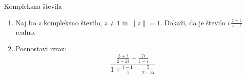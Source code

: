 \begin{frame}{Kompleksna števila}
	\begin{enumerate}
		\item
		Naj bo $z$ kompleksno število, $z \ne 1$ in $\|z\| = 1$.
		Dokaži, da je število \( i \, \frac{z+1}{z-1} \) realno.
		\item
		Poenostavi izraz:
		\[\frac{\displaystyle\frac{3 + i}{2 - 2i}+\frac{7i}{1 - i}}{\displaystyle1+\frac{i - 1}{4}-\frac{5}{2 - 3i}}\]
	\end{enumerate}
\end{frame}